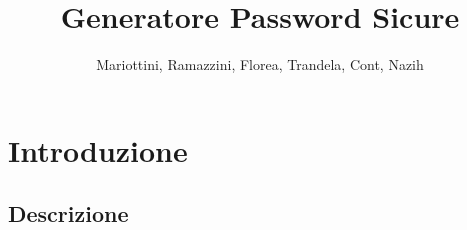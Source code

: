 \documentclass{scrartcl}
\title{Generatore Password Sicure}
\author{Mariottini, Ramazzini, Florea, Trandela, Cont, Nazih}
\date{}
\begin{document}
    \maketitle

    \section{Introduzione}

        \subsection{Descrizione}

            \lipsum[5]
\end{document}
